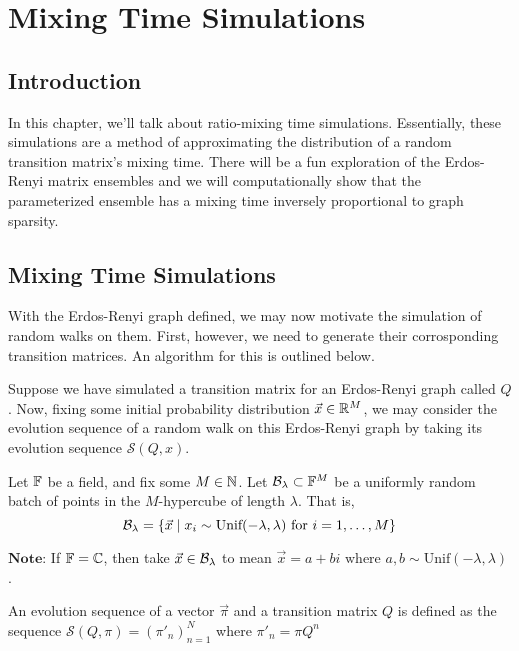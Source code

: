 \chapter{Mixing Time Simulations}
\section{Introduction}
In this chapter, we'll talk about ratio-mixing time simulations. Essentially, these simulations are a method of approximating the distribution of a random transition matrix's mixing time. There will be a fun exploration of the Erdos-Renyi matrix ensembles and we will computationally show that the parameterized ensemble has a mixing time inversely proportional to graph sparsity.


\section{Mixing Time Simulations}
With the Erdos-Renyi graph defined, we may now motivate the simulation of random walks on them. First, however, we need to generate their corrosponding transition matrices. An algorithm for this is outlined below.

Suppose we have simulated a transition matrix for an Erdos-Renyi graph called $Q$. Now, fixing some initial probability distribution $\vec{x} \in \R^M$, we may consider the evolution sequence of a random walk on this Erdos-Renyi graph by taking its evolution sequence $\mathcal{S}(Q, x)$.

\begin{definition}
Let $\F$ be a field, and fix some $M \in \N$. Let $\B_\lambda \subset \F^M$ be a uniformly random batch of points in the $M$-hypercube of length $\lambda$. That is, 
$$\B_\lambda = \{\vec{x} \mid x_i \sim \text{Unif}(-\lambda, \lambda) \text{ for } i = \oneto[M]\}$$

$\textbf{Note:}$ If $\F = \mathbb{C}$, then take $\vec{x} \in \B_\lambda$ to mean $\vec{x} = a + bi \text{ where } a,b \sim \text{Unif}(-\lambda,\lambda)$.
\end{definition}


\begin{definition}
An evolution sequence of a vector $\vec{\pi}$ and a transition matrix $Q$ is defined as the sequence $\mathcal{S}(Q,\pi) = ( \pi'_n )_{n=1}^N$ where $ \pi'_n  = \pi Q^n$
\end{definition}

